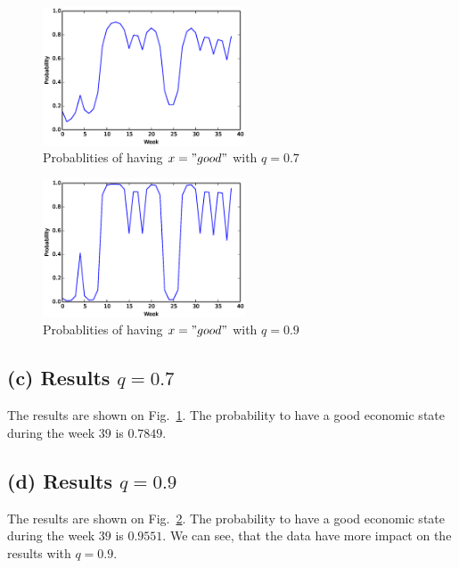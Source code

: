 \documentclass[a4paper]{article}
\begin{document}
\begin{figure}
    \begin{center}
        \includegraphics[width=6cm]{prob_07.eps}
        \caption{Probablities of having $x = "good"$ with $q=0.7$}
        \label{fig:hmm07}
    \end{center}
\end{figure}

\begin{figure}
    \begin{center}
        \includegraphics[width=6cm]{prob_09.eps}
        \caption{Probablities of having $x = "good"$ with $q=0.9$}
        \label{fig:hmm09}
    \end{center}
\end{figure}

\subsection{(c) Results $q=0.7$}
The results are shown on Fig.~\ref{fig:hmm07}. The probability to have a good economic state 
during the week $39$ is $0.7849$.

\subsection{(d) Results $q=0.9$}
The results are shown on Fig.~\ref{fig:hmm09}. The probability to have a good economic state
during the week $39$ is $0.9551$. We can see, that the data have more impact on the results
with $q=0.9$. 

\section{}
\end{document}
